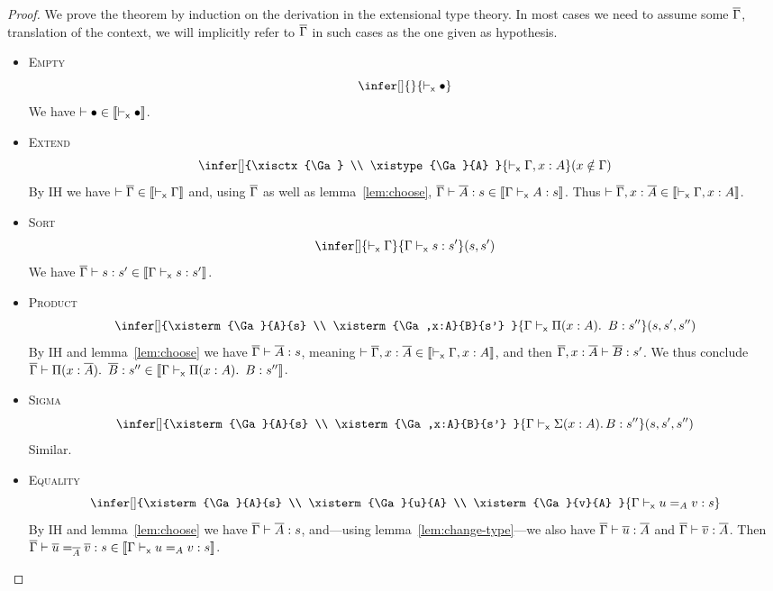 \begin{proof}
  We prove the theorem by induction on the derivation in the extensional
  type theory. In most cases we need to assume some $\Gb$, translation of the
  context, we will implicitly refer to $\Gb$ in such cases as the one given as
  hypothesis.
  \leavevmode
  \begin{itemize}
    \item \textsc{Empty}
    \[
      \infer[]
        { }
        {\xisctx{\ctxempty}}
    \]
    We have $\isctx{\ctxempty} \in \transl{\xisctx{\ctxempty}}$.

    \item \textsc{Extend}
    \[
      \infer[]
        {\xisctx{\Ga} \\
         \xistype{\Ga}{A}
        }
        {\xisctx{\Ga, x:A}}
      (x \notin \Ga)
    \]
    By IH we have $\isctx{\Gb} \in \transl{\xisctx{\Ga}}$ and, using $\Gb$
    as well as lemma~\ref{lem:choose},
    $\isterm{\Gb}{\Ab}{s} \in \transl{\xisterm{\Ga}{A}{s}}$.
    Thus $\isctx{\Gb, x:\Ab} \in \transl{\xisctx{\Ga, x:A}}$.

    \item \textsc{Sort}
    \[
      \infer[]
        {\xisctx{\Ga}}
        {\xisterm{\Ga}{s}{s'}}
      (s,s')
    \]
    We have $\isterm{\Gb}{s}{s'} \in \transl{\xisterm{\Ga}{s}{s'}}$.

    \item \textsc{Product}
    \[
      \infer[]
        {\xisterm{\Ga}{A}{s} \\
         \xisterm{\Ga,x:A}{B}{s'}
        }
        {\xisterm{\Ga}{\Prod{x:A} B}{s''}}
      (s,s',s'')
    \]
    By IH and lemma~\ref{lem:choose} we have $\isterm{\Gb}{\Ab}{s}$,
    meaning $\isctx{\Gb,x:\Ab} \in \transl{\xisctx{\Ga, x:A}}$,
    and then $\isterm{\Gb,x:\Ab}{\Bb}{s'}$.
    We thus conclude
    $\isterm{\Gb}{\Prod{x:\Ab} \Bb}{s''} \in
    \transl{\xisterm{\Ga}{\Prod{x:A} B}{s''}}$.

    \item \textsc{Sigma}
    \[
      \infer[]
        {\xisterm{\Ga}{A}{s} \\
         \xisterm{\Ga,x:A}{B}{s'}
        }
        {\xisterm{\Ga}{\Sum{x:A} B}{s''}}
      (s,s',s'')
    \]
    Similar.

    \item \textsc{Equality}
    \[
      \infer[]
        {\xisterm{\Ga}{A}{s} \\
         \xisterm{\Ga}{u}{A} \\
         \xisterm{\Ga}{v}{A}
        }
        {\xisterm{\Ga}{\Eq{A}{u}{v}}{s}}
    \]
    By IH and lemma~\ref{lem:choose} we have $\isterm{\Gb}{\Ab}{s}$,
    and---using lemma~\ref{lem:change-type}---we also have
    $\isterm{\Gb}{\ub}{\Ab}$ and $\isterm{\Gb}{\vb}{\Ab}$.
    Then
    $\isterm{\Gb}{\Eq{\Ab}{\ub}{\vb}}{s} \in
    \transl{\xisterm{\Ga}{\Eq{A}{u}{v}}{s}}$.


\end{itemize}
\end{proof}
